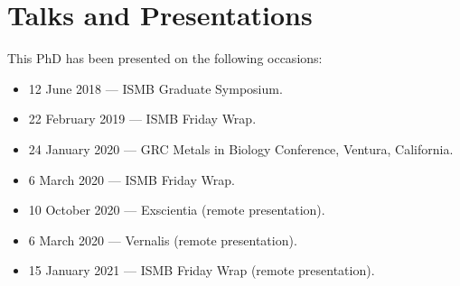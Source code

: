\section{Talks and Presentations}

This PhD has been presented on the following occasions:

\begin{itemize}
  \item 12 June 2018 --- ISMB Graduate Symposium.
  \item 22 February 2019 --- ISMB Friday Wrap.
  \item 24 January 2020 --- GRC Metals in Biology Conference, Ventura, California.
  \item 6 March 2020 --- ISMB Friday Wrap.
  \item 10 October 2020 --- Exscientia (remote presentation).
  \item 6 March 2020 --- Vernalis (remote presentation).
  \item 15 January 2021 --- ISMB Friday Wrap (remote presentation).
\end{itemize}

